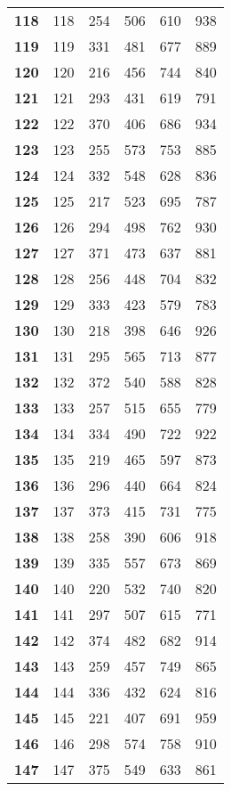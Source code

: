 \begin{longtable}{|l|c|c|c|c|c|}
    \textbf{118} & 118 &254 & 506 & 610 & 938 \\
    \textbf{119} & 119 &331 & 481 & 677 & 889 \\
    \textbf{120} & 120 &216 & 456 & 744 & 840 \\
    \textbf{121} & 121 &293 & 431 & 619 & 791 \\
    \textbf{122} & 122 &370 & 406 & 686 & 934 \\
    \textbf{123} & 123 &255 & 573 & 753 & 885 \\
    \textbf{124} & 124 &332 & 548 & 628 & 836 \\
    \textbf{125} & 125 &217 & 523 & 695 & 787 \\
    \textbf{126} & 126 &294 & 498 & 762 & 930 \\
    \textbf{127} & 127 &371 & 473 & 637 & 881 \\
    \textbf{128} & 128 &256 & 448 & 704 & 832 \\
    \textbf{129} & 129 &333 & 423 & 579 & 783 \\
    \textbf{130} & 130 &218 & 398 & 646 & 926 \\
    \textbf{131} & 131 &295 & 565 & 713 & 877 \\
    \textbf{132} & 132 &372 & 540 & 588 & 828 \\
    \textbf{133} & 133 &257 & 515 & 655 & 779 \\
    \textbf{134} & 134 &334 & 490 & 722 & 922 \\
    \textbf{135} & 135 &219 & 465 & 597 & 873 \\
    \textbf{136} & 136 &296 & 440 & 664 & 824 \\
    \textbf{137} & 137 &373 & 415 & 731 & 775 \\
    \textbf{138} & 138 &258 & 390 & 606 & 918 \\
    \textbf{139} & 139 &335 & 557 & 673 & 869 \\
    \textbf{140} & 140 &220 & 532 & 740 & 820 \\
    \textbf{141} & 141 &297 & 507 & 615 & 771 \\
    \textbf{142} & 142 &374 & 482 & 682 & 914 \\
    \textbf{143} & 143 &259 & 457 & 749 & 865 \\
    \textbf{144} & 144 &336 & 432 & 624 & 816 \\
    \textbf{145} & 145 &221 & 407 & 691 & 959 \\
    \textbf{146} & 146 &298 & 574 & 758 & 910 \\
    \textbf{147} & 147 &375 & 549 & 633 & 861 \\

\end{longtable}
